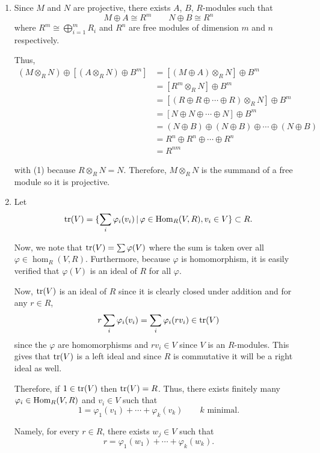 \documentclass[12pt]{AlgebraQual}
\begin{document}
\begin{solution}$\,$
\begin{enumerate}[label=(\alph*)]
    \item Since $M$ and $N$ are projective, there exists $A$, $B$, $R$-modules such that $$M\oplus A\cong R^m\qquad N\oplus B\cong R^n$$ where $R^m\cong\bigoplus_{i=1}^mR_i$ and $R^n$ are free modules of dimension $m$ and $n$ respectively.

    Thus,  \begin{align*}
        (M\otimes_RN)\oplus[(A\otimes_R N)\oplus B^m]&=[(M\oplus A)\otimes_RN]\oplus B^m\\
        &=[R^m\otimes_RN]\oplus B^m\\
        &=[(R\oplus R\oplus\cdots\oplus R)\otimes_R N]\oplus B^m\\
        &=[N\oplus N\oplus \cdots\oplus N]\oplus B^m\tag{1}\\
        &=(N\oplus B)\oplus (N\oplus B)\oplus \cdots \oplus (N\oplus B)\\
        &=R^n\oplus R^n\oplus\cdots\oplus R^n\\
        &=R^{nm}
    \end{align*}

    with (1) because $R\otimes_R N=N.$ Therefore, $M\otimes_R N$ is the summand of a free module so it is projective.

    \item Let $$\text{tr}(V)=\{\sum_i\varphi_i(v_i)\,|\,\varphi\in\text{Hom}_R(V,R),v_i\in V\}\subset R.$$

    Now, we note that $\text{tr}(V)=\sum\varphi(V)$ where the sum is taken over all $\varphi\in\hom_R(V,R)$. Furthermore, because $\varphi$ is homomorphism, it is easily verified that $\varphi(V)$ is an ideal of $R$ for all $\varphi$.

    Now, $\text{tr}(V)$ is an ideal of $R$ since it is clearly closed under addition and for any $r\in R$, $$r\sum_i\varphi_i(v_i)=\sum_i\varphi_i(rv_i)\in\text{tr}(V)$$ since the $\varphi$ are homomorphisms and $rv_i\in V$ since $V$ is an $R$-modules. This gives that $\text{tr}(V)$ is a left ideal and since $R$ is commutative it will be a right ideal as well.

    Therefore, if $1\in\text{tr}(V)$ then $\text{tr}(V)=R$. Thus, there exists finitely many $\varphi_i\in\text{Hom}_R(V,R)$ and $v_i\in V$ such that $$1=\varphi_1(v_1)+\cdots+\varphi_k(v_k)\qquad k\text{ minimal}.$$

    Namely, for every $r\in R$, there exists $w_j\in V$ such that $$r=\varphi_1(w_1)+\cdots+\varphi_k(w_k).$$


\end{enumerate}
\end{solution}
\end{document}
